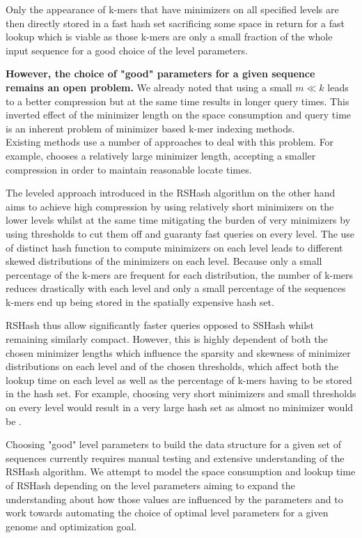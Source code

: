 \documentclass[a4paper,titlepage,onecolumn,oneside,12pt,nenglish,titlepage=firstiscover]{scrbook}
\theoremstyle{plain} %
\theoremstyle{definition} %
\theoremstyle{remark} %
\theoremstyle{plain}
\begin{document}
Only the appearance of k-mers that have \frequent minimizers on all specified levels are then directly stored in a fast hash set sacrificing some space in return for a fast lookup which is viable as those k-mers are only a small fraction of the whole input sequence for a good choice of the level parameters.

\textbf{However, the choice of "good" parameters for a given sequence remains an open problem.} We already noted that using a small $m \ll k$ leads to a better compression but at the same time results in longer query times. This inverted effect of the minimizer length on the space consumption and query time is an inherent problem of minimizer based k-mer indexing methods.\\
Existing methods use a number of approaches to deal with this problem. For example, \citet{pibiri_sparse_2022} chooses a relatively large minimizer length, accepting a smaller compression in order to maintain reasonable locate times.

The leveled approach introduced in the RSHash algorithm on the other hand aims to achieve high compression by using relatively short minimizers on the lower levels whilst at the same time mitigating the burden of very \frequent minimizers by using thresholds to cut them off and guaranty fast queries on every level. The use of distinct hash function to compute minimizers on each level leads to different skewed distributions of the minimizers on each level. Because only a small percentage of the k-mers are frequent for each distribution, the number of k-mers reduces drastically with each level and only a small percentage of the sequences k-mers end up being stored in the spatially expensive hash set.

RSHash thus allow significantly faster queries opposed to SSHash whilst remaining similarly compact.
However, this is highly dependent of both the chosen minimizer lengths which influence the sparsity and skewness of minimizer distributions on each level and of the chosen thresholds, which affect both the lookup time on each level as well as the percentage of k-mers having to be stored in the hash set. For example, choosing very short minimizers and small thresholds on every level would result in a very large hash set as almost no minimizer would be \infrequent. 

Choosing "good" level parameters to build the data structure for a given set of sequences currently requires manual testing and extensive understanding of the RSHash algorithm. 
We attempt to model the space consumption and lookup time of RSHash depending on the level parameters aiming to expand the understanding about how those values are influenced by the parameters and to work towards automating the choice of optimal level parameters for a given genome and optimization goal.
\end{document}
